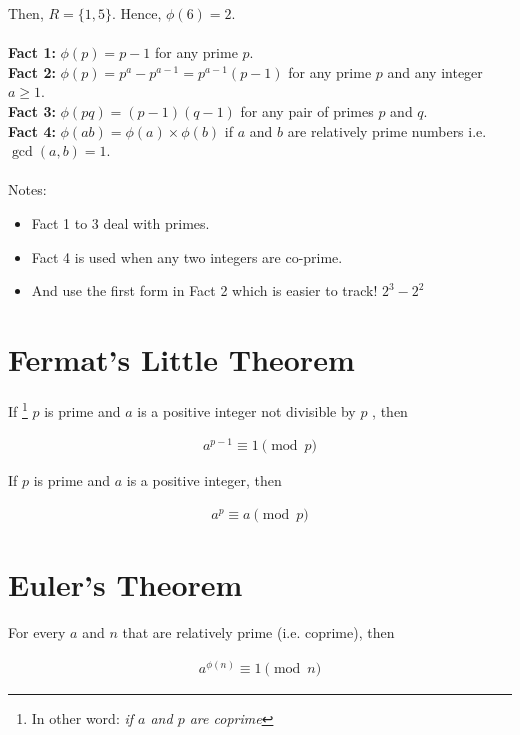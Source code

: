 \documentclass[a4paper]{article}
\begin{document}
Then, $R = \{1, 5\}$. Hence, $\phi{(6) = 2}$.
\\
\\
\textbf{Fact 1:} $\phi{(p)} = p - 1$ \quad for any prime $p$. \\
\textbf{Fact 2:} $\phi{(p)} = p^a - p^{a - 1} = p^{a - 1} (p - 1)$ \quad for any prime $p$ and any integer $a \geq 1 $. \\
\textbf{Fact 3:} $\phi{(pq)} = (p - 1) (q - 1)$ \quad for any pair of primes $p$ and $q$. \\
\textbf{Fact 4:} $\phi{(ab)} = \phi{(a)} \times \phi{(b)}$ \quad if $a$ and $b$ are relatively prime numbers i.e. $\gcd(a, b) = 1$. \\
\\
Notes: 
\begin{itemize}
\item Fact 1 to 3 deal with primes. 
\item Fact 4 is used when any two integers are co-prime.
\item And use the first form in Fact 2 which is easier to track! $2^3 - 2^{2}$
\end{itemize}



\section{Fermat's Little Theorem}

If \footnote{In other word: \textit{if  $a$ and $p$ are coprime}} $p$ is prime and $a$ is a positive integer not divisible by $p$ , then

\begin{align}
a^{p-1} \equiv 1 \pmod{p}
\end{align}

If $p$ is prime and $a$ is a positive integer, then

\begin{align}
\label{fermat2}
a^{p} \equiv a \pmod{p}
\end{align}


\section{Euler's Theorem}

For every $a$ and $n$ that are relatively prime (i.e. coprime), then

\begin{align}
a^{\phi{(n)}} \equiv 1 \pmod{n}
\end{align}
\end{document}
